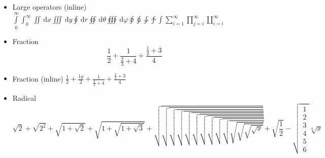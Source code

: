 \documentclass[11pt,fleqn]{article}
\newcommand{\dd}{\,\mathrm{d}}
\begin{document}
\begin{itemize}
  \item Large operators (inline)
        $ \int\limits_0^\infty \int_0^\infty \iint \dd{x} \iiint \dd{y}
          \oint \dd{r} \oiint \dd{\theta} \oiiint \dd{\varphi}\varointclockwise \ointctrclockwise \awint \intclockwise
          \int\sum_{i=1}^\infty \prod_{j=i}^\infty \coprod_{i=i}^\infty $

  \item Fraction
        \[ \frac{1}{2} + \frac{1}{\frac{2}{3}+4} + \frac{\frac{1}{2}+3}{4} \]

  \item Fraction (inline)
        $ \frac{1}{2} + \frac{1g}{2} + \frac{1}{\frac{2}{3}+4} + \frac{\frac{1}{2}+3}{4} $

  \item Radical
        \[
            \sqrt{2} + \sqrt{2^2} + \sqrt{1+\sqrt{2}} + \sqrt{1+\sqrt{1+\sqrt{3}}}
          + \sqrt{\sqrt{\sqrt{\sqrt{\sqrt{\sqrt{\sqrt{\sqrt{\sqrt{\sqrt{\sqrt{\sqrt{\sqrt{\sqrt{x}}}}}}}}}}}}}} + \sqrt{\frac{1}{2}}-\sqrt{\begin{matrix}
          	1\\2\\3\\4\\5\\6
            \end{matrix}}
            \sqrt[a]{x}
        \]


\end{itemize}
\end{document}
